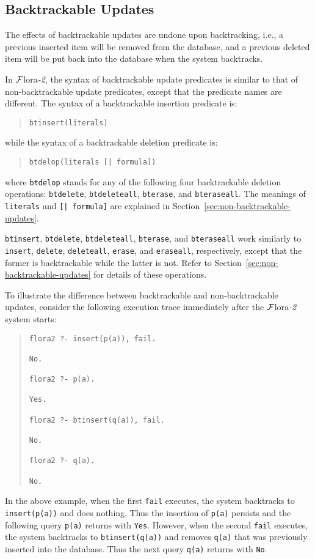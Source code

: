 \documentclass[11pt]{article}
\newcommand{\FLORA}{{\mbox{${\cal F}${\sc lora}\rm\emph{-2}}}\xspace}
\begin{document}
\subsection{Backtrackable Updates}


%
The effects of backtrackable updates are undone upon backtracking,
i.e., a previous inserted item will be removed from the database, and
a previous deleted item will be put back into the database when the
system backtracks.

%
In \FLORA, the syntax of backtrackable update predicates is similar
to that of non-backtrackable update predicates, except that the
predicate names are different. The syntax of a backtrackable insertion
predicate is:
\begin{quote}
\verb|btinsert(literals)|
\end{quote}
while the syntax of a backtrackable deletion predicate is:
\begin{quote}
\begin{verbatim}
btdelop(literals [| formula])
\end{verbatim}
\end{quote}
where {\tt btdelop} stands for any of the following four backtrackable
deletion operations: {\tt btdelete}, {\tt btdeleteall}, {\tt bterase}, and
{\tt bteraseall}. The meanings of {\tt literals} and {\tt [| formula]} are
explained in Section~\ref{sec:non-backtrackable-updates}.

{\tt btinsert}, {\tt btdelete}, {\tt btdeleteall}, {\tt bterase}, and
{\tt bteraseall} work similarly to {\tt insert}, {\tt delete},
{\tt deleteall}, {\tt erase}, and {\tt eraseall}, respectively, except that
the former is backtrackable while the latter is not. Refer to
Section~\ref{sec:non-backtrackable-updates} for details of these
operations.

To illustrate the difference between backtrackable and
non-backtrackable updates, consider the following execution trace
immediately after the \FLORA system starts:
\begin{quote}
\begin{verbatim}
flora2 ?- insert(p(a)), fail.

No.

flora2 ?- p(a).

Yes.

flora2 ?- btinsert(q(a)), fail.

No.

flora2 ?- q(a).

No.
\end{verbatim}
\end{quote}
In the above example, when the first \verb|fail| executes, the system
backtracks to {\tt insert(p(a))} and does nothing. Thus the insertion
of {\tt p(a)} persists and the following query \verb|p(a)| returns
with {\tt Yes}. However, when the second \verb|fail| executes, the
system backtracks to {\tt btinsert(q(a))} and removes {\tt q(a)} that
was previously inserted into the database. Thus the next query
\verb|q(a)| returns with {\tt No}.
\end{document}
